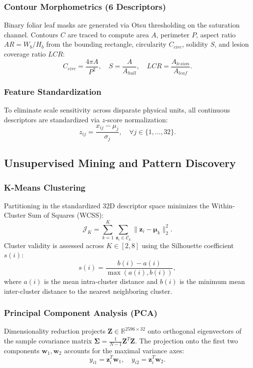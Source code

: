 \documentclass[conference,a4paper]{IEEEtran}
\begin{document}
\subsubsection{Contour Morphometrics (6 Descriptors)}
Binary foliar leaf masks are generated via Otsu thresholding on the saturation channel. Contours $C$ are traced to compute area $A$, perimeter $P$, aspect ratio $AR = W_b / H_b$ from the bounding rectangle, circularity $C_{circ}$, solidity $S$, and lesion coverage ratio $LCR$:
\begin{equation}
C_{circ} = \frac{4\pi A}{P^2}, \quad S = \frac{A}{A_{hull}}, \quad LCR = \frac{A_{lesion}}{A_{leaf}}.
\end{equation}

\subsubsection{Feature Standardization}
To eliminate scale sensitivity across disparate physical units, all continuous descriptors are standardized via $z$-score normalization:
\begin{equation}
z_{ij} = \frac{x_{ij} - \mu_j}{\sigma_j}, \quad \forall j \in \{1, \dots, 32\}.
\end{equation}

\subsection{Unsupervised Mining and Pattern Discovery}

\subsubsection{K-Means Clustering}
Partitioning in the standardized 32D descriptor space minimizes the Within-Cluster Sum of Squares (WCSS):
\begin{equation}
\mathcal{J}_{K} = \sum_{k=1}^K \sum_{\mathbf{z}_i \in \mathcal{C}_k} \|\mathbf{z}_i - \boldsymbol{\mu}_k\|_2^2.
\end{equation}
Cluster validity is assessed across $K \in [2, 8]$ using the Silhouette coefficient $s(i)$:
\begin{equation}
s(i) = \frac{b(i) - a(i)}{\max\left(a(i), b(i)\right)},
\end{equation}
where $a(i)$ is the mean intra-cluster distance and $b(i)$ is the minimum mean inter-cluster distance to the nearest neighboring cluster.

\subsubsection{Principal Component Analysis (PCA)}
Dimensionality reduction projects $\mathbf{Z} \in \mathbb{R}^{2596 \times 32}$ onto orthogonal eigenvectors of the sample covariance matrix $\boldsymbol{\Sigma} = \frac{1}{N-1} \mathbf{Z}^T \mathbf{Z}$. The projection onto the first two components $\mathbf{w}_1, \mathbf{w}_2$ accounts for the maximal variance axes:
\begin{equation}
y_{i1} = \mathbf{z}_i^T \mathbf{w}_1, \quad y_{i2} = \mathbf{z}_i^T \mathbf{w}_2.
\end{equation}
\end{document}
